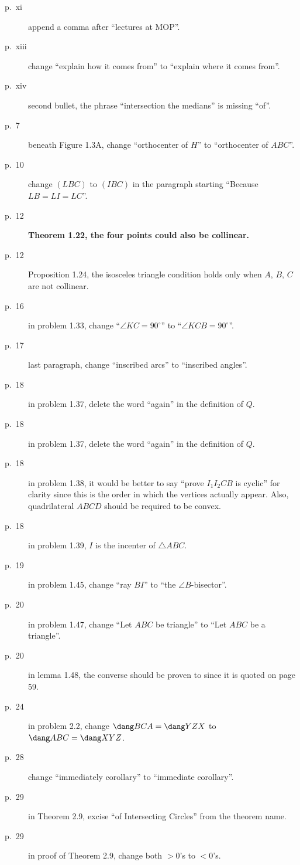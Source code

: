 \documentclass[11pt]{scrartcl}
\newcommand{\crucial}[1]{\textbf{\sffamily\large\color{red} #1}}
\begin{document}
\begin{description}
\item[p.\  xi] append a comma after ``lectures at MOP''.
\item[p.\  xiii] change ``explain how it comes from'' to ``explain where it comes from''.
\item[p.\  xiv] second bullet, the phrase ``intersection the medians'' is missing ``of''.
\item[p.\  7] beneath Figure 1.3A, change ``orthocenter of $H$'' to ``orthocenter of $ABC$''.
\item[p.\  10] change $(LBC)$ to $(IBC)$ in the paragraph starting ``Because $LB=LI=LC$''.
\item[p.\  12] \crucial{Theorem 1.22, the four points could also be collinear.}
\item[p.\  12] Proposition 1.24, the isosceles triangle condition holds
  only when $A$, $B$, $C$ are not collinear.
\item[p.\  16] in problem 1.33, change ``$\angle KC=90^{\circ}$'' to ``$\angle KCB=90^{\circ}$''.
\item[p.\  17] last paragraph, change ``inscribed arcs'' to ``inscribed angles''.
\item[p.\  18] in problem 1.37, delete the word ``again'' in the definition of $Q$.
\item[p.\  18] in problem 1.37, delete the word ``again'' in the definition of $Q$.
\item[p.\  18] in problem 1.38, it would be better to say
  ``prove $I_1 I_2 C B$ is cyclic'' for clarity
  since this is the order in which the vertices actually appear.
  Also, quadrilateral $ABCD$ should be required to be convex.
\item[p.\  18] in problem 1.39, $I$ is the incenter of $\triangle ABC$.
\item[p.\  19] in problem 1.45, change ``ray $BI$'' to ``the $\angle B$-bisector''.
\item[p.\  20] in problem 1.47, change ``Let $ABC$ be triangle'' to ``Let $ABC$ be a triangle''.
\item[p.\  20] in lemma 1.48, the converse should be proven to since it is quoted on page 59.
\item[p.\  24] in problem 2.2, change $\dang BCA = \dang YZX$
  to $\dang ABC = \dang XYZ$.
\item[p.\  28] change ``immediately corollary'' to ``immediate corollary''.
\item[p.\  29] in Theorem 2.9, excise ``of Intersecting Circles'' from the theorem name.
\item[p.\  29] in proof of Theorem 2.9, change both $>0$'s to $<0$'s.

\end{description}
\end{document}
